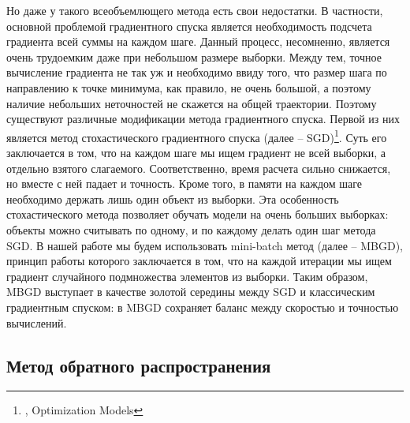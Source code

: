 \documentclass[12pt, a4paper]{article}
\begin{document}
Но даже у такого всеобъемлющего метода есть свои недостатки. В частности, основной проблемой градиентного спуска является необходимость подсчета градиента всей суммы на каждом шаге. Данный процесс, несомненно, является очень трудоемким даже при небольшом размере выборки. Между тем, точное вычисление градиента не так уж и необходимо ввиду того, что размер шага по направлению к точке минимума, как правило, не очень большой, а поэтому наличие небольших неточностей не скажется на общей траектории. Поэтому существуют различные модификации метода градиентного спуска. Первой из них является метод стохастического градиентного спуска (далее – SGD)\footnote{\cite{Optimization}, Optimization Models}. Суть его заключается в том, что на каждом шаге мы ищем градиент не всей выборки, а отдельно взятого слагаемого. Соответственно, время расчета сильно снижается, но вместе с ней падает и точность. Кроме того, в памяти на каждом шаге необходимо держать лишь один объект из выборки. Эта особенность стохастического метода позволяет обучать модели на очень больших выборках: объекты можно считывать по одному, и по каждому делать один шаг метода SGD. В нашей работе мы будем использовать mini-batch метод (далее – MBGD), принцип работы которого заключается в том, что на каждой итерации мы ищем градиент случайного подмножества элементов из выборки. Таким образом, MBGD выступает в качестве золотой середины между SGD и классическим градиентным спуском: в MBGD сохраняет баланс между скоростью и точностью вычислений.

\subsection{Метод обратного распространения}
\end{document}
